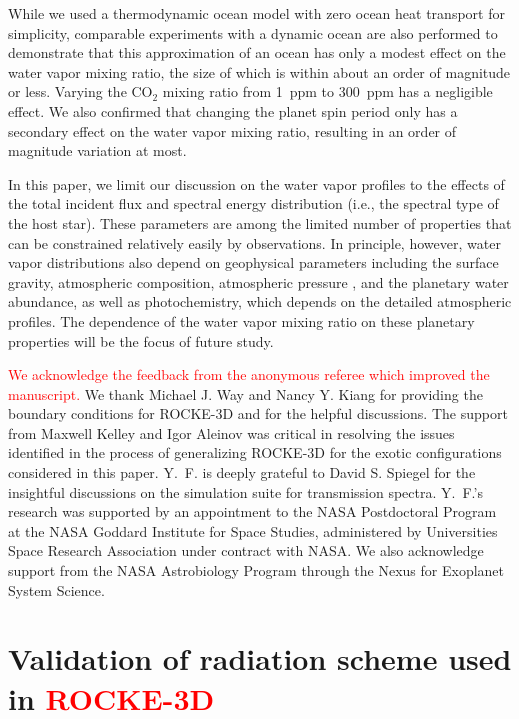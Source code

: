 \documentclass[11pt,numberedappendix,twocolappendix,]{emulateapj}
\def\modelE{ROCKE-3D}
\def\wv{water vapor}
\def\addYF#1{\textcolor{red}{#1}}
\begin{document}
While we used a thermodynamic ocean model with zero ocean heat transport for simplicity, comparable experiments with a dynamic ocean are also performed to demonstrate that this approximation of an ocean has only a modest effect on the \wv{} mixing ratio, the size of which is within about an order of magnitude or less. 
Varying the CO$_2$ mixing ratio from 1~ppm to 300~ppm has a negligible effect. 
We also confirmed that changing the planet spin period only has a secondary effect on the \wv{} mixing ratio, resulting in an order of magnitude variation at most. 

In this paper, we limit our discussion on the \wv{} profiles to the effects of the total incident flux and spectral energy distribution (i.e., the spectral type of the host star). 
These parameters are among the limited number of properties that can be constrained relatively easily by observations. 
In principle, however, \wv{} distributions also depend on geophysical parameters including the surface gravity, atmospheric composition, atmospheric pressure \addYF{\citep[e.g.,][]{Turbet2016}}, and the planetary water abundance, as well as photochemistry, which depends on the detailed atmospheric profiles. 
The dependence of the \wv{} mixing ratio on these planetary properties will be  the focus of future study. 


\acknowledgments
\addYF{We acknowledge the feedback from the anonymous referee which improved the manuscript. }
We thank Michael J. Way and Nancy Y. Kiang for providing the boundary conditions for \modelE{} and for the helpful discussions. 
The support from Maxwell Kelley and Igor Aleinov was critical in resolving the issues identified in the process of generalizing \modelE{} for the exotic configurations considered in this paper. 
Y.~F. is deeply grateful to David S. Spiegel for the insightful discussions on the simulation suite for transmission spectra. 
Y.~F.'s research was supported by an appointment to the NASA Postdoctoral Program at the NASA Goddard Institute for Space Studies, administered by Universities Space Research Association under contract with NASA. 
We also acknowledge support from the NASA Astrobiology Program through the Nexus for Exoplanet System Science.




\appendix


\section{Validation of radiation scheme used in \addYF{\modelE{}} }
\label{ap:radiation}
\end{document}
